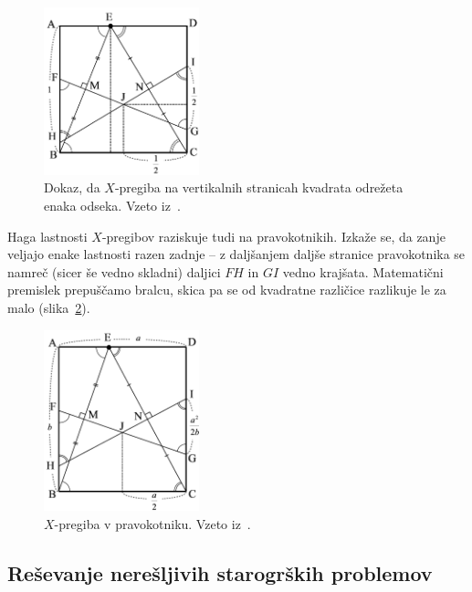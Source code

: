 \begin{figure}[h]
    \centering
    \includegraphics[width=0.4\textwidth]{images/x-pregibi/dokaz_odseki.png}
    \caption[Dokaz za dolžini odsekov $X$-pregibov]{Dokaz, da $X$-pregiba na vertikalnih stranicah kvadrata odrežeta enaka odseka. Vzeto iz~\cite[str.\ 41]{haga2008}.}
    \label{fig:x-pregib_dokaz_odsek}
\end{figure}

Haga lastnosti $X$-pregibov raziskuje tudi na pravokotnikih. Izkaže se, da zanje veljajo enake lastnosti razen zadnje -- z daljšanjem daljše stranice pravokotnika se namreč (sicer še vedno skladni) daljici $FH$ in $GI$ vedno krajšata. Matematični premislek prepuščamo bralcu, skica pa se od kvadratne različice razlikuje le za malo (slika~\ref{fig:x-pregib_dokaz_pravokotnik}).

\begin{figure}[h]
    \centering
    \includegraphics[width=0.4\textwidth]{images/x-pregibi/dokaz_pravokotnik.png}
    \caption[$X$-pregiboa v pravokotniku]{$X$-pregiba v pravokotniku. Vzeto iz~\cite[str.\ 44]{haga2008}.}
    \label{fig:x-pregib_dokaz_pravokotnik}
\end{figure}


\subsection{Reševanje nerešljivih starogrških problemov}
\label{podpogl:starogrskiproblemi}


